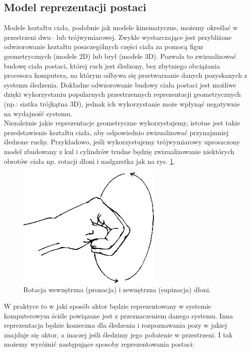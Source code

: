 \subsection{Model reprezentacji postaci}
Modele kształtu ciała, podobnie jak modele kinematyczne, możemy określać w przestrzeni dwu-- lub trójwymiarowej. Zwykle wystarczające jest przybliżone odwzorowanie kształtu poszczególnych części ciała za pomocą figur geometrycznych (modele 2D) lub brył (modele 3D). Pozwala to zwizualizować budowę ciała postaci, której ruch jest śledzony, bez zbytniego obciążania procesora komputera, na którym odbywa się przetwarzanie danych pozyskanych z systemu śledzenia. Dokładne odwzorowanie budowy ciała postaci jest możliwe dzięki wykorzystaniu popularnych przestrzennych reprezentacji geometrycznych (np.: siatka trójkątna 3D), jednak ich wykorzystanie może wpłynąć negatywnie na wydajność systemu. \\
Niezależnie jakie reprezentacje geometryczne wykorzystujemy, istotne jest takie przedstawienie kształtu ciała, aby odpowiednio zwizualizować przynajmniej śledzone ruchy. Przykładowo, jeśli wykorzystujemy trójwymiarowy uproszczony model zbudowany z kul i cylindrów trudne będzię zwizualizowanie niektórych obrotów ciała np. rotacji dłoni i nadgarstka jak na rys. \ref{fig:literature:wristRotation}.\\
		
\begin{figure}[!htp]
	\centering	
	\includegraphics[height=6cm]{images/Wrist_joint_rotation.png}
	\caption{Rotacja wewnętrzna (pronacja) i zewnętrzna (supinacja) dłoni.}	
	\label{fig:literature:wristRotation}
\end{figure}

W praktyce to w jaki sposób aktor będzie reprezentowany w systemie komputerowym ściśle powiązane jest z przeznaczeniem danego systemu. Inna reprezentacja będzie konieczna dla śledzenia i rozpoznawania pozy w jakiej znajduje się aktor, a inaczej jeśli śledzimy jego położenie w przestrzeni. I tak możemy wyróżnić następujące sposoby reprezentowania postaci:
	
